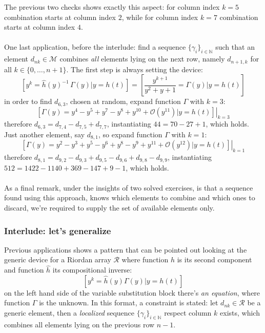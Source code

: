 \documentclass[11pt,a4paper]{article} %
\begin{document}
    The previous two checks shows exactly this aspect: for column index $k=5$
    combination starts at column index $2$, while for column index $k=7$ combination
    starts at column index $4$.
    \\\\
    One last application, before the interlude: 
    find a sequence $\lbrace \gamma_{i} \rbrace_{i\in\mathbb{N}}$ such that 
    an element $d_{nk}\in\mathcal{M}$ combines \emph{all} elements lying on 
    the next row, namely $d_{n+1,k}$ for all $k\in\lbrace0,\ldots,n+1\rbrace$.
    The first step is always setting the device:
    \begin{displaymath}
        \left[y^{k} = \hat{h}(y)^{-1}\,\Gamma(y) \big| y = h(t) \right]=
            \left[ \frac{y^{k + 1}}{y^2 + y + 1} = \Gamma(y) \big| y = h(t) \right]
    \end{displaymath}
    in order to find $d_{6,3}$, chosen at random, expand function $\Gamma$ with $k=3$:
    \begin{displaymath}
        \left.\left[\Gamma(y)=y^4 -y^5 + y^7 -y^8 +y^{10} + \mathcal{O}(y^{11}) 
            \big| y = h(t) \right]\right|_{k=3}
    \end{displaymath}
    therefore $d_{6,3}=d_{7,4} - d_{7,5} + d_{7,7}$, instantiating $44 = 70 -27 +1$, 
    which holds. Just another element, say $d_{8,1}$, so expand function 
    $\Gamma$ with $k=1$:
    \begin{displaymath}
        \left.\left[\Gamma(y)=y^2 -y^3 + y^5 -y^6 + y^8 -y^9 + y^{11} + 
            \mathcal{O}(y^{12}) \big| y = h(t) \right]\right|_{k=1}
    \end{displaymath}
    therefore $d_{8,1}=d_{9,2} - d_{9,3} + d_{9,5}- d_{9,6}+ d_{9,8}- d_{9,9}$, 
    instantiating $512 = 1422 -1140 +369 -147 +9 -1$, which holds.
    \\\\
    As a final remark, under the insights of two solved exercises, is that a
    sequence found using this approach, knows which elements to combine and which
    ones to discard, we're required to supply the set of available elements only.


    \subsubsection{Interlude: let's generalize}
    
    Previous applications shows a pattern that can be pointed out looking at 
    the generic device for a Riordan array $\mathcal{R}$ where 
    function $h$ is its second component and function $\hat{h}$ its compositional
    inverse:
    \begin{displaymath}
        \left[y^{k} = \hat{h}(y) \Gamma(y) \big| y = h(t) \right]
    \end{displaymath}
    on the left hand side of the variable substitution block there's \emph{an
    equation}, where function $\Gamma$ is the unknown. In this format, 
    a constraint is stated: let $d_{nk}\in\mathcal{R}$ be a generic element, 
    then a \emph{localized} sequence 
    $\lbrace \gamma_{i} \rbrace_{i\in\mathbb{N}}$ respect column $k$ exists, which
    combines all elements lying on the previous row $n-1$.
\end{document}
